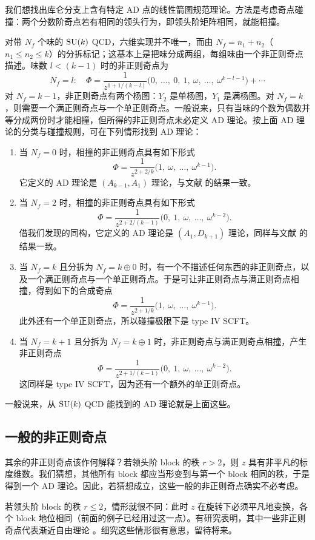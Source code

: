 我们想找出库仑分支上含有特定 AD 点的线性箭图规范理论。方法是考虑奇点碰撞：两个分数阶奇点若有相同的领头行为，即领头阶矩阵相同，就能相撞。

对带 $N_f$ 个味的 $\operatorname{SU}(k)$ QCD，六维实现并不唯一，而由 $N_f=n_1+n_2$（$n_1\le n_2\le k$）的分拆标记；这基本上是把味分成两组，每组味由一个非正则奇点描述。味数 $l<(k-1)$ 时的非正则奇点为
\begin{equation}
N_f = l:\quad \Phi = \frac{1}{z^{1+1/(k-l)}}\bigl(0,\ \dots,\ 0,\ 1,\ \omega,\ \dots,\ \omega^{k-l-1}\bigr)+\cdots
\label{eq:6.43}\tag{6.43}
\end{equation}
对 $N_f=k-1$，非正则奇点有两个杨图：$Y_2$ 是单杨图，$Y_1$ 是满杨图。对 $N_f=k$，则需要一个满正则奇点与一个单正则奇点。一般说来，只有当味的个数为偶数并等分成两份时才能相撞，但所得的非正则奇点未必定义 AD 理论。按上面 AD 理论的分类与碰撞规则，可在下列情形找到 AD 理论：
\begin{enumerate}[label=\textup{\alph*.}]
  \item 当 $N_f=0$ 时，相撞的非正则奇点具有如下形式
\begin{equation}
\Phi = \frac{1}{z^{2+2/k}}\bigl(1,\ \omega,\ \dots,\ \omega^{k-1}\bigr) .
\label{eq:6.44}\tag{6.44}
\end{equation}
它定义的 AD 理论是 $(A_{k-1},A_1)$ 理论，与文献 \cite{12} 的结果一致。

  \item 当 $N_f=2$ 时，相撞的非正则奇点具有如下形式
\begin{equation}
\Phi = \frac{1}{z^{2+2/(k-1)}}\bigl(0,\ 1,\ \omega,\ \dots,\ \omega^{k-2}\bigr) .
\label{eq:6.45}\tag{6.45}
\end{equation}
借我们发现的同构，它定义的 AD 理论是 $(A_1,D_{k+1})$ 理论，同样与文献 \cite{12} 的结果一致。

  \item 当 $N_f=k$ 且分拆为 $N_f=k\oplus 0$ 时，有一个不描述任何东西的非正则奇点，以及一个满正则奇点与一个单正则奇点。于是可让非正则奇点与满正则奇点相撞，得到如下的合成奇点
\begin{equation}
\Phi = \frac{1}{z^{2+1/k}}\bigl(1,\ \omega,\ \dots,\ \omega^{k-1}\bigr) .
\label{eq:6.46}\tag{6.46}
\end{equation}
此外还有一个单正则奇点，所以碰撞极限下是 type IV SCFT。

  \item 当 $N_f=k+1$ 且分拆为 $N_f=k\oplus 1$ 时，非正则奇点与满正则奇点相撞，产生非正则奇点
\begin{equation}
\Phi = \frac{1}{z^{2+1/(k-1)}}\bigl(0,\ 1,\ \omega,\ \dots,\ \omega^{k-2}\bigr) .
\label{eq:6.47}\tag{6.47}
\end{equation}
这同样是 type IV SCFT，因为还有一个额外的单正则奇点。
\end{enumerate}
一般说来，从 $\operatorname{SU}(k)$ QCD 能找到的 AD 理论就是上面这些。

\subsection{一般的非正则奇点}
\label{sec:6.6}

其余的非正则奇点该作何解释？若领头阶 block 的秩 $r>2$，则 $z$ 具有非平凡的标度维数。我们猜想，其他所有 block 都应当形变到与第一个 block 相同的秩，于是得到一个 AD 理论。因此，若猜想成立，这些一般的非正则奇点确实不必考虑。

若领头阶 block 的秩 $r\le 2$，情形就很不同：此时 $z$ 在旋转下必须平凡地变换，各个 block 地位相同（前面的例子已经用过这一点）。有研究表明，其中一些非正则奇点代表渐近自由理论 \cite{32}。细究这些情形很有意思，留待将来。

